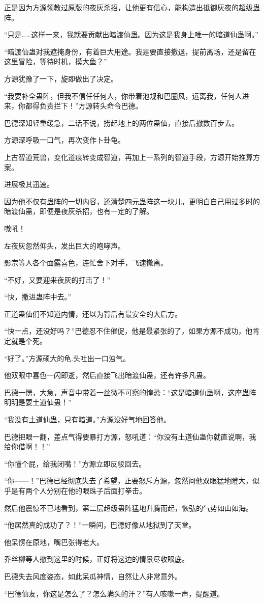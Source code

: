 \begin{this_body}
正是因为方源领教过原版的夜灰杀招，让他更有信心，能构造出抵御灰夜的超级蛊阵。

“只是……这样一来，我就要贡献出暗渡仙蛊。因为这是我身上唯一的暗道仙蛊啊。”

“暗渡仙蛊对我遮掩身份，有着巨大用途。我是要直接撤退，提前离场，还是留在这里冒险，等待时机，摸大鱼？”

方源犹豫了一下，旋即做出了决定。

“我要补全蛊阵，但我不信任任何人，你带着池规和巴圈风，远离我，任何人进来，你都得负责拦下！”方源转头命令巴德。

巴德深知轻重缓急，二话不说，捞起地上的两位蛊仙，直接后撤数百步去。

方源深呼吸一口气，再次变作卜卦龟。

上古智道荒兽，变化道痕转变成智道，再加上一系列的智道手段，方源开始推算方案。

进展极其迅速。

因为他不仅有蛊阵的一切内容，还清楚四元蛊阵这一块儿，更明白自己用过多时的暗渡仙蛊，即便是夜灰杀招，也有一定的了解。

嗷吼！

左夜灰忽然仰头，发出巨大的咆哮声。

影宗等人各个面露喜色，连忙舍下对手，飞速撤离。

“不好，又要迎来夜灰的打击了！”

“快，撤进蛊阵中去。”

正道蛊仙们不知道内情，还以为背后有最安全的大后方。

“快一点，还没好吗？”巴德忍不住催促，他是最紧张的了，如果方源不成功，他肯定就是个死。

“好了。”方源硕大的龟.头吐出一口浊气。

他双眼中喜色一闪即逝，然后直接飞出暗渡仙蛊，还有许多凡蛊。

巴德一愣，大急，声音中带着一丝微不可察的惶恐：“这是暗道仙蛊啊，这座蛊阵明明是要土道仙蛊！”

“我没有土道仙蛊，只有暗道。”方源没好气地回答他。

巴德把眼一翻，差点气得要暴打方源，怒吼道：“你没有土道仙蛊你就直说啊，我给你借啊！！”

“你懂个屁，给我闭嘴！”方源立即反驳回去。

“你——！”巴德已经彻底失去了希望，正要怒斥方源，忽然间他双眼猛地瞪大，似乎是有两个人分别在他的眼珠子后面打拳击。

然后他震惊不已地看到，第二层超级蛊阵猛地升腾而起，恢弘的气势如山如海。

“他居然真的成功了？！”一瞬间，巴德好像从地狱到了天堂。

他呆愣在原地，嘴巴张得老大。

乔丝柳等人撤到这里的时候，正好将这边的情景尽收眼底。

巴德失去风度姿态，如此呆瓜神情，自然让人非常意外。

“巴德仙友，你这是怎么了？怎么满头的汗？”有人咳嗽一声，提醒道。

\end{this_body}

